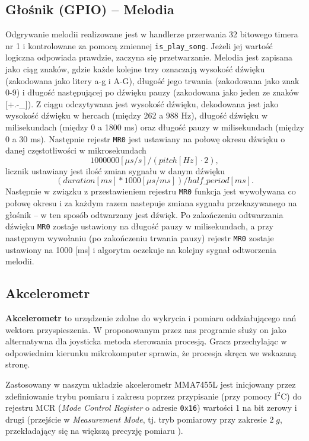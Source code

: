 \documentclass[a4paper,12pt,twoside]{article}
\theoremstyle{plain}
\theoremstyle{definition}
\theoremstyle{remark}
\begin{document}
\subsection{Głośnik (GPIO) -- Melodia}
Odgrywanie melodii realizowane jest w handlerze przerwania 32 bitowego timera nr 1 i kontrolowane za pomocą zmiennej
\verb|is_play_song|. Jeżeli jej wartość logiczna odpowiada prawdzie, zaczyna się przetwarzanie. Melodia jest zapisana jako ciąg znaków, 
gdzie każde kolejne trzy oznaczają wysokość dźwięku (zakodowana jako litery a-g i A-G), długość jego trwania (zakodowana jako znak 0-9) i długość następującej 
po dźwięku pauzy (zakodowana jako jeden ze znaków [+.-\_]). Z ciągu odczytywana jest wysokość dźwięku, dekodowana jest jako wysokość dźwięku w hercach 
(między 262 a 988 Hz), długość dźwięku w milisekundach (między 0 a 1800 ms) oraz długość pauzy w milisekundach (między 0 a 30 ms).
Następnie rejestr \verb|MR0| jest ustawiany na połowę okresu dźwięku o danej częstotliwości w mikrosekundach \[ 1000000[\mu s/s]/(pitch[Hz] \cdot 2),\] 
licznik ustawiany jest ilość zmian sygnału w danym dźwięku \[(duration[ms] * 1000[\mu s/ms])/half\_period[ms].\] Następnie w związku z przestawieniem rejestru \verb|MR0| 
funkcja jest wywoływana co połowę okresu i za każdym razem nastepuje zmiana sygnału przekazywanego na głośnik -- w ten sposób odtwarzany jest dźwięk. 
Po zakończeniu odtwarzania dźwięku \verb|MR0| zostaje ustawiony na długość pauzy w milisekundach, a przy następnym wywołaniu (po zakończeniu trwania pauzy) 
rejestr \verb|MR0| zostaje ustawiony na 1000 [ms] i algorytm oczekuje na kolejny sygnał odtworzenia melodii.
\subsection{Akcelerometr}
\textbf{Akcelerometr} to urządzenie zdolne do wykrycia i pomiaru oddziałującego nań wektora przyspieszenia. W proponowanym przez nas programie służy on jako alternatywna dla joysticka metoda sterowania procesją. Gracz przechylając w odpowiednim kierunku mikrokomputer sprawia, że procesja skręca we wskazaną stronę.

Zastosowany w naszym układzie akcelerometr MMA7455L jest inicjowany przez zdefiniowanie trybu pomiaru i zakresu poprzez przypisanie (przy pomocy I$^2$C) do rejestru MCR (\textit{Mode Control Register} o adresie \verb|0x16|) wartości 1 na bit zerowy i drugi (przejście w \textit{Measurement Mode}, tj. tryb pomiarowy przy zakresie $2 \; g$, przekładający się na większą precyzję pomiaru \cite{ACCEL}).
\end{document}
